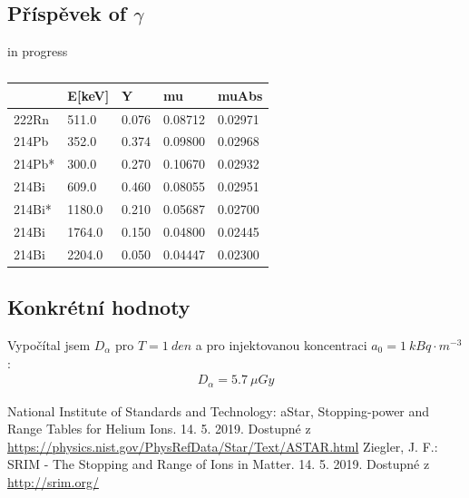 \documentclass[11pt,a4paper]{article}
\begin{document}
\subsection{Příspěvek of $\gamma$}
in progress
\begin{table}[ht]
	\centering
	\caption{}
	\label{tab:gamy}
	\begin{tabular}{lllll}
		\toprule	 
		{} &  E[keV] &      Y &       mu &    muAbs \\
		\midrule
		222Rn  &   511.0 &  0.076 &  0.08712 &  0.02971 \\
		214Pb  &   352.0 &  0.374 &  0.09800 &  0.02968 \\
		214Pb* &   300.0 &  0.270 &  0.10670 &  0.02932 \\
		214Bi  &   609.0 &  0.460 &  0.08055 &  0.02951 \\
		214Bi* &  1180.0 &  0.210 &  0.05687 &  0.02700 \\
		214Bi  &  1764.0 &  0.150 &  0.04800 &  0.02445 \\
		214Bi  &  2204.0 &  0.050 &  0.04447 &  0.02300 \\
		\bottomrule
	\end{tabular}
\end{table}
\subsection{Konkrétní hodnoty}
Vypočítal jsem $D_{\alpha}$ pro $T=\SI{1}{den}$ a pro injektovanou koncentraci $a_0=\SI{1}{kBq\cdot m^{-3}}$:
\begin{align}
	D_{\alpha}=\SI{5.7}{\mu Gy}
\end{align}
\begin{thebibliography}{Mm99}
	 National Institute of Standards and Technology: aStar, Stopping-power and Range Tables for Helium Ions. 14. 5. 2019. Dostupné z \url{https://physics.nist.gov/PhysRefData/Star/Text/ASTAR.html}
	 Ziegler, J. F.: SRIM - The Stopping and Range of Ions in Matter. 14. 5. 2019. Dostupné z \url{http://srim.org/} 
\end{thebibliography}
\end{document}

